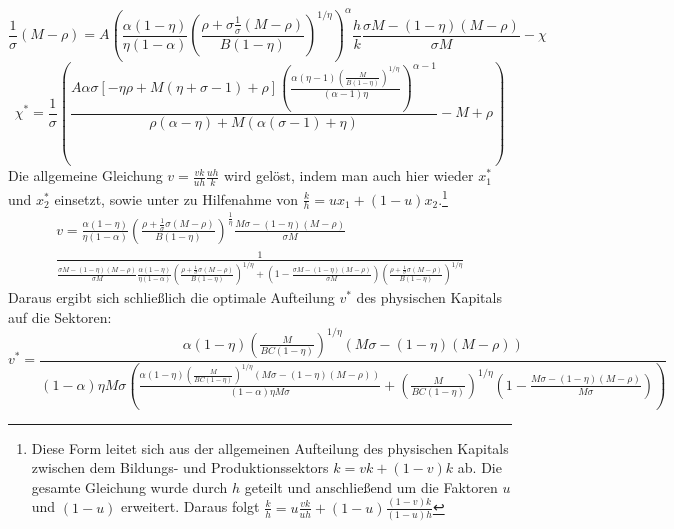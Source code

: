 \begin{equation*}
\frac{1}{\sigma} (M-\rho)=A\left(\frac{\alpha(1-\eta)}{\eta(1-\alpha)}\left(\frac{\rho+\sigma\frac{1}{\sigma} (M-\rho)}{B(1-\eta)}\right)^{1/\eta}\right)^{\alpha}\frac{h}{k}\frac{\sigma M-(1-\eta)(M-\rho)}{\sigma M}-\chi
\end{equation*}
\begin{equation}
\boxed{\chi^*=\frac{1}{\sigma}\left(\frac{A\alpha \sigma[-\eta\rho+M(\eta+\sigma-1)+\rho] \left(\frac{\alpha  (\eta -1) \left(\frac{M}{B (1-\eta) }\right)^{1/\eta }}{(\alpha -1) \eta }\right)^{\alpha -1}}{\rho  (\alpha -\eta )+M (\alpha  (\sigma -1)+\eta )}-M+\rho\right)}
\end{equation}
Die allgemeine Gleichung $v=\frac{vk}{uh}\frac{uh}{k}$ wird gelöst, indem man auch hier wieder $x_1^*$ und $x_2^*$ einsetzt, sowie unter zu Hilfenahme von $\frac{k}{h}=u x_1+(1-u)x_2$.\footnote{Diese Form leitet sich aus der allgemeinen Aufteilung des physischen Kapitals zwischen dem Bildungs- und Produktionssektors $k=vk+(1-v)k$ ab. Die gesamte Gleichung wurde durch $h$ geteilt und anschlie{\ss}end um die Faktoren $u$ und $(1-u)$ erweitert. Daraus folgt $\frac{k}{h}=u\frac{vk}{uh}+(1-u)\frac{(1-v)k}{(1-u)h}$}
\begin{equation}
\begin{split}
v=\frac{\alpha(1-\eta)}{\eta(1-\alpha)} \left(\frac{\rho+\frac{1}{\sigma} \sigma(M-\rho)}{B (1-\eta )}\right)^{\frac{1}{\eta}} \frac{M \sigma -(1-\eta ) (M-\rho )}{ \sigma M}\\
\frac{1}{\frac{ \sigma M -(1-\eta ) (M-\rho )}{\sigma M }\frac{\alpha(1-\eta)}{\eta(1-\alpha)}\left(\frac{\rho+\frac{1}{\sigma}\sigma(M-\rho )}{B (1-\eta )}\right)^{1/\eta }+\left(1-\frac{ \sigma M-(1-\eta ) (M-\rho )}{ \sigma M}\right) \left(\frac{\rho+\frac{1}{\sigma}\sigma(M-\rho )}{B (1-\eta )}\right)^{1/\eta }}
\end{split}
\end{equation}
Daraus ergibt sich schlie{\ss}lich die optimale Aufteilung $v^*$ des physischen Kapitals auf die Sektoren:
\begin{equation}
\boxed{
v^*=\frac{\alpha  (1-\eta ) \left(\frac{M}{B C (1-\eta )}\right)^{1/\eta } (M \sigma -(1-\eta ) (M-\rho ))}{(1-\alpha ) \eta  M \sigma  \left(\frac{\alpha  (1-\eta ) \left(\frac{M}{B C (1-\eta )}\right)^{1/\eta } (M \sigma -(1-\eta ) (M-\rho ))}{(1-\alpha ) \eta  M \sigma }+\left(\frac{M}{B C (1-\eta )}\right)^{1/\eta } \left(1-\frac{M \sigma -(1-\eta ) (M-\rho )}{M \sigma }\right)\right)}}
\end{equation}



